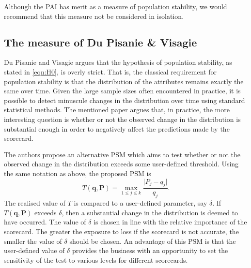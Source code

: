 \documentclass{article}
\theoremstyle{def}
\begin{document}
Although the PAI has merit as a measure of population stability, we would recommend that this measure not be considered in isolation.




\subsection{The measure of Du Pisanie \& Visagie \cite{DUPISANIEVISAGIE2020}}

Du Pisanie and Visagie \cite{DUPISANIEVISAGIE2020} argues that the hypothesis of population stability, as stated in \eqref{eqn:H0}, is overly strict. That is, the classical requirement for population stability is that the distribution of the attributes remains exactly the same over time. Given the large sample sizes often encountered in practice, it is possible to detect minuscule changes in the distribution over time using standard statistical methods. The mentioned paper argues that, in practice, the more interesting question is whether or not the observed change in the distribution is substantial enough in order to negatively affect the predictions made by the scorecard.

The authors propose an alternative PSM which aims to test whether or not the observed change in the distribution exceeds some user-defined threshold. Using the same notation as above, the proposed PSM is
\begin{equation}
    T(\mathbf{q},\mathbf{P}) = \max_{1\leq j\leq k}\frac{\lvert P_j - q_j \rvert}{q_j}. \label{DVF}
\end{equation}
The realised value of $T$ is compared to a user-defined parameter, say $\delta$. If $T(\mathbf{q},\mathbf{P})$ exceeds $\delta$, then a substantial change in the distribution is deemed to have occurred. The value of $\delta$ is chosen in line with the relative importance of the scorecard. The greater the exposure to loss if the scorecard is not accurate, the smaller the value of $\delta$ should be chosen. An advantage of this PSM is that the user-defined value of $\delta$ provides the business with an opportunity to set the sensitivity of the test to various levels for different scorecards.
\end{document}
